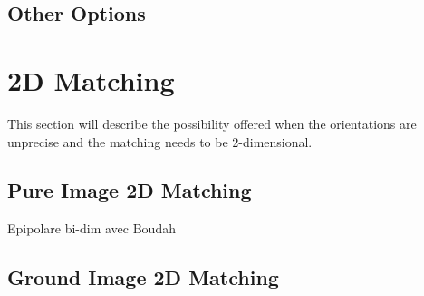 \subsection{Other Options}

\section{2D Matching}

This section will describe the possibility offered when the orientations
are unprecise and the matching needs to be 2-dimensional.

\subsection{Pure Image 2D Matching}
Epipolare bi-dim avec Boudah

\subsection{Ground Image 2D Matching}






